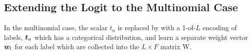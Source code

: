 %
%
%
%
%
%
%


\subsection*{Extending the Logit to the Multinomial Case}
In the multinomial case,  the scalar $t_n$ is replaced by with a 1-of-$L$ encoding of labels, $\bm t_n$ which has a categorical distribution, and learn a separate weight vector $\bm w_l$ for each label which are collected into the $L \times F$ matrix W. 

